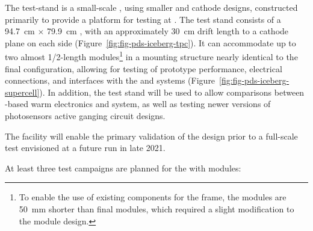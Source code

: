 The  test-stand is a small-scale , using smaller   and cathode designs, constructed primarily to provide a platform for   testing at . 
The test stand consists of a \SI{94.7}{cm} $\times$ \SI{79.9}{cm} , with an approximately \SI{30}{cm} drift length to a cathode plane on each side (Figure~\ref{fig:fig-pds-iceberg-tpc}).  
It can accommodate up to two almost 1/2-length  modules\footnote{To enable the use of existing components for the  frame, the  modules are \SI{50}{mm} shorter than final modules, which required a slight modification to the  module design.} in a mounting structure nearly identical to the final   configuration, allowing for testing of  prototype performance, electrical connections, and interfaces with the  and  systems (Figure~\ref{fig:fig-pds-iceberg-supercell}). 
In addition, the test stand will be used to allow comparisons between -based warm electronics and   system, as well as testing newer versions of photosensors active ganging circuit designs.

The  facility will enable the primary validation of the  design prior to a full-scale test envisioned at a future  run in late 2021. 

At least three test campaigns are planned for the   with  modules:  

